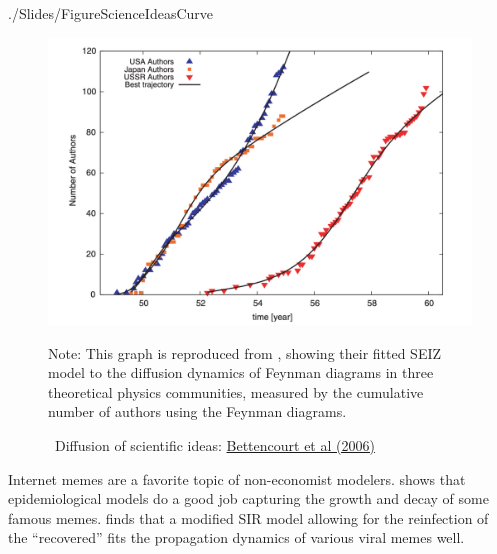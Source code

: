 \begin{verbatimwrite}{./Slides/FigureScienceIdeasCurve}
	\begin{figure}[!ht] \centering  %
		\caption{ ~Diffusion of scientific ideas: \href{http://web.mit.edu/dikaiser/www/BAKC.PhysA.pdf}{Bettencourt et al (2006)}}\nocite{bettencourt2006power}
		\label{fig:science_ideas_curve}
		\centerline{\includegraphics[width=\textwidth]{./figures/Feynman}}
		\begin{flushleft}{\footnotesize Note: This graph is reproduced from \cite{bettencourt2006power}, showing their fitted SEIZ model to the diffusion dynamics of Feynman diagrams in three theoretical physics communities, measured by the cumulative number of authors using the Feynman diagrams.}
		\end{flushleft}
	\end{figure}
\end{verbatimwrite}%



Internet memes are a favorite topic of non-economist modelers. \href{https://github.com/iworld1991/EpiExp/blob/master/Literature/bauckhage2011insights.pdf}{\cite{bauckhage2011insights}} shows that epidemiological models do a good job capturing the growth and decay of some famous memes. \cite{wang2011epidemiological} finds that a modified SIR model allowing for the reinfection of the ``recovered'' fits  the propagation dynamics of various viral memes well.  %

